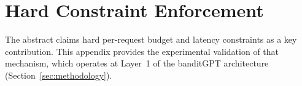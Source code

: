 
\section{Hard Constraint Enforcement}
\label{app:constraint_enforcement}

The abstract claims hard per-request budget and latency constraints as a key contribution. This appendix provides the experimental validation of that mechanism, which operates at Layer~1 of the banditGPT architecture (Section~\ref{sec:methodology}).


